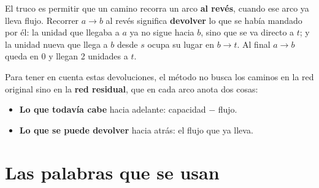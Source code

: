 \documentclass[11pt,a4paper]{article}
\newcommand{\ar}[4][arco]{\draw[#1] (#2) to node[etq, lbl] {#4} (#3);}
\begin{document}
\begin{center}
\qquad
{}
\end{center}

El truco es permitir que un camino recorra un arco \textbf{al revés}, cuando ese arco ya lleva flujo. Recorrer
$a\to b$ al revés significa \textbf{devolver} lo que se había mandado por él: la unidad que llegaba a $a$ ya no
sigue hacia $b$, sino que se va directo a $t$; y la unidad nueva que llega a $b$ desde $s$ ocupa su lugar en
$b\to t$. Al final $a\to b$ queda en 0 y llegan 2 unidades a $t$.

Para tener en cuenta estas devoluciones, el método no busca los caminos en la red original sino en la
\textbf{red residual}, que en cada arco anota dos cosas:
\begin{itemize}[itemsep=2pt]
  \item \textbf{Lo que todavía cabe} hacia adelante: capacidad $-$ flujo.
  \item \textbf{Lo que se puede devolver} hacia atrás: el flujo que ya lleva.
\end{itemize}

\section{Las palabras que se usan}
\end{document}

